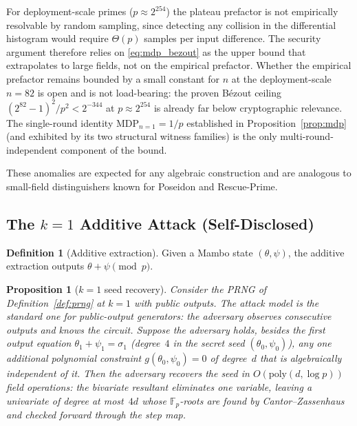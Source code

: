 \documentclass[11pt,a4paper]{article}
\newtheorem{proposition}[theorem]{Proposition}
\theoremstyle{definition}
\newtheorem{definition}[theorem]{Definition}
\newcommand{\Fp}{\mathbb{F}_p}
\begin{document}
For deployment-scale primes ($p \approx 2^{254}$) the plateau prefactor
is not empirically resolvable by random sampling, since detecting any
collision in the differential histogram would require $\Theta(p)$ samples
per input difference. The security argument therefore relies on
\eqref{eq:mdp_bezout} as the upper bound that extrapolates to large
fields, not on the empirical prefactor. Whether the empirical prefactor
remains bounded by a small constant for $n$ at the deployment-scale
$n = 82$ is open and is not load-bearing: the proven B\'ezout ceiling
$(2^{82} - 1)^2 / p^2 < 2^{-344}$ at $p \approx 2^{254}$ is already far
below cryptographic relevance. The single-round identity
$\mathrm{MDP}_{n=1} = 1/p$ established in
Proposition~\ref{prop:mdp} (and exhibited by its two structural
witness families) is the only multi-round-independent component
of the bound.

These anomalies are expected for any algebraic construction and are
analogous to small-field distinguishers known for Poseidon and
Rescue-Prime.


\subsection{The $k=1$ Additive Attack (Self-Disclosed)}\label{sec:security:k1attack}

\begin{definition}[Additive extraction]\label{def:additive}
Given a Mambo state $(\theta, \psi)$, the additive extraction outputs
$\theta + \psi \pmod{p}$.
\end{definition}

\begin{proposition}[$k=1$ seed recovery]\label{thm:k1attack}
Consider the PRNG of Definition~\ref{def:prng} at $k=1$ with public
outputs. The attack model is the standard one for public-output
generators: the adversary observes consecutive outputs and knows the
circuit. Suppose the adversary holds, besides the first output
equation $\theta_1 + \psi_1 = \sigma_1$ (degree~$4$ in the secret
seed $(\theta_0, \psi_0)$), any one additional polynomial constraint
$g(\theta_0, \psi_0) = 0$ of degree~$d$ that is algebraically
independent of it. Then the adversary recovers the seed in
$O(\mathrm{poly}(d, \log p))$ field operations: the bivariate
resultant eliminates one variable, leaving a univariate of degree at
most~$4d$ whose $\Fp$-roots are found by Cantor--Zassenhaus and
checked forward through the step map.
\end{proposition}
\end{document}
